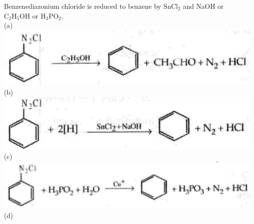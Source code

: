\documentclass[10pt]{article}
\begin{document}
Benzenediazonium chloride is reduced to benzene by $\mathrm{SnCl}_{2}$ and NaOH or $\mathrm{C}_{2} \mathrm{H}_{5} \mathrm{OH}$ or $\mathrm{H}_{3} \mathrm{PO}_{2}$.\\
(a)\\
\includegraphics[max width=\textwidth, center]{2025_01_28_8470952b98110cec3aabg-205(1)}\\
(b)\\
\includegraphics[max width=\textwidth, center]{2025_01_28_8470952b98110cec3aabg-205(5)}\\
(c)\\
\includegraphics[max width=\textwidth, center]{2025_01_28_8470952b98110cec3aabg-205(7)}\\
(d)\\
\end{document}
